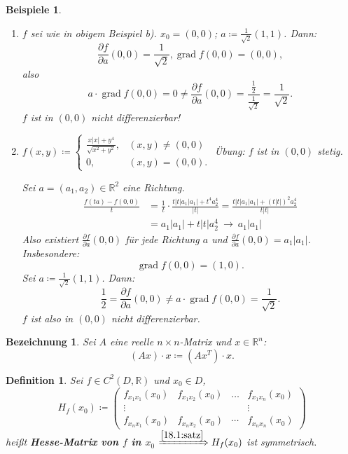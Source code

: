 \documentclass[12pt]{extreport} %
\newcommand{\R}{\mathbb{R}}
\theoremstyle{named}
\theoremstyle{nnamed}
\theoremstyle{itshape}
\newtheorem*{definition}{Definition}
\theoremstyle{normal}
\newtheorem*{beispiele}{Beispiele}
\newtheorem*{bezeichnung}{Bezeichnung}
\begin{document}
\begin{beispiele} ~\
	\begin{enumerate}
		\item $f$ sei wie in obigem Beispiel b). $x_{0} = (0, 0)$; $a \coloneqq \frac{1}{\sqrt{2}} (1, 1)$. Dann:
			$$ \frac{\partial f}{\partial a} (0,0) = \frac{1}{\sqrt{2}}, \operatorname{grad} f(0,0) = (0, 0), $$
			also
			$$ a \cdot \operatorname{grad} f(0,0) = 0 \neq \frac{\partial f}{\partial a} (0,0) = \frac{\frac{1}{2}}{\frac{1}{\sqrt{2}}} = \frac{1}{\sqrt{2}}. $$
			$f$ ist in $(0,0)$ nicht differenzierbar!
		\item $f(x,y) \coloneqq \begin{cases} \frac{x |x| + y^{4}}{\sqrt{x^{2} + y^{2}}}, & (x, y) \neq (0, 0) \\ 0, & (x, y) = (0,0). \end{cases}$
			Übung: $f$ ist in $(0, 0)$ stetig.
			
			\bigskip
			
			Sei $a = (a_{1}, a_{2}) \in \R^{2}$ eine Richtung.
			\begin{align*}
				\frac{f(ta) - f(0,0)}{t} & = \frac{1}{t} \cdot \frac{t |t| a_{1} |a_{1}| + t^{4} a_{2}^{4}}{|t|} = \frac{t |t| a_{1} |a_{1}| + \left( t |t| \right)^{2} a_{2}^{4}}{t |t|}  \\ 
				& = a_{1} |a_{1}| + t |t| a_{2}^{4} ~\longrightarrow~ a_{1} |a_{1}| 
			\end{align*} 
			Also existiert $\frac{\partial f}{\partial a} (0, 0)$ für jede Richtung $a$ und $\frac{\partial f}{\partial a}(0, 0) = a_{1} |a_{1}|$. Insbesondere: 
				$$\operatorname{grad} f(0,0) = (1, 0). $$
			Sei $a \coloneqq \frac{1}{\sqrt{2}} (1, 1)$. Dann:
				$$ \frac{1}{2} = \frac{\partial f}{\partial a}(0, 0) \neq a \cdot \operatorname{grad} f(0, 0) = \frac{1}{\sqrt{2}}. $$
			$f$ ist also in $(0, 0)$ nicht differenzierbar.
	\end{enumerate}
\end{beispiele}

\begin{bezeichnung}
	Sei $A$ eine reelle $n \times n$-Matrix und $x \in \R^{n}$:
	$$ \left( A x \right) \cdot x \coloneqq \left( A x^{T} \right) \cdot x. $$	
\end{bezeichnung}

\begin{definition}
	Sei $f \in C^{2}\left( D, \R \right)$ und $x_{0} \in D$,
	$$ H_{f}(x_{0}) \coloneqq \begin{pmatrix} f_{x_{1} x_{1}}(x_{0}) & f_{x_{1} x_{2}}(x_{0}) & \dotsc & f_{x_{1} x_{n}}(x_{0}) \\ \vdots & ~ & ~ & \vdots \\ f_{x_{n} x_{1}}(x_{0}) & f_{x_{n} x_{2}}(x_{0}) & \cdots & f_{x_{n} x_{n}}(x_{0}) \end{pmatrix} $$
	hei{\ss}t \textbf{Hesse-Matrix von $f$ in $x_{0}$} $\xRightarrow[]{\ref{18.1:satz}} H_{f}(x_{0})$ ist symmetrisch.
\end{definition}
\end{document}
